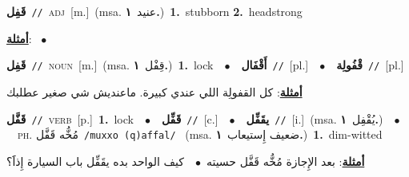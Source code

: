 \documentclass[10pt,a4paper,twoside]{article} %
\begin{document}
\begin{multicols}{2}
{\setlength\topsep{0pt}\textbf{\foreignlanguage{arabic}{قَفِل}}\ {\color{gray}\texttt{//}\color{black}}\ \textsc{adj}\ [m.]\ \color{gray}(msa. \foreignlanguage{arabic}{عنيد}~\foreignlanguage{arabic}{\textbf{١.}})\color{black}\ \textbf{1.}~stubborn  \textbf{2.}~headstrong\  \begin{flushright}\color{gray}\foreignlanguage{arabic}{\textbf{\underline{\foreignlanguage{arabic}{أمثلة}}}: \ $\bullet$\ \  }\end{flushright}\color{black}} \vspace{2mm}

{\setlength\topsep{0pt}\textbf{\foreignlanguage{arabic}{قَفِل}}\ {\color{gray}\texttt{//}\color{black}}\ \textsc{noun}\ [m.]\ \color{gray}(msa. \foreignlanguage{arabic}{قِفْل}~\foreignlanguage{arabic}{\textbf{١.}})\color{black}\ \textbf{1.}~lock\ \ $\bullet$\ \ \setlength\topsep{0pt}\textbf{\foreignlanguage{arabic}{أَقْفَال}}\ {\color{gray}\texttt{//}\color{black}}\ [pl.]\ \ $\bullet$\ \ \setlength\topsep{0pt}\textbf{\foreignlanguage{arabic}{قْفُولِة}}\ {\color{gray}\texttt{//}\color{black}}\ [pl.]\  \begin{flushright}\color{gray}\foreignlanguage{arabic}{\textbf{\underline{\foreignlanguage{arabic}{أمثلة}}}: كل القفولِة اللي عندي كبيرة. ماعنديش شي صغير عطلبك}\end{flushright}\color{black}} \vspace{2mm}

{\setlength\topsep{0pt}\textbf{\foreignlanguage{arabic}{قَفَّل}}\ {\color{gray}\texttt{//}\color{black}}\ \textsc{verb}\ [p.]\ \textbf{1.}~lock\ \ $\bullet$\ \ \setlength\topsep{0pt}\textbf{\foreignlanguage{arabic}{قَفِّل}}\ {\color{gray}\texttt{//}\color{black}}\ [c.]\ \ $\bullet$\ \ \setlength\topsep{0pt}\textbf{\foreignlanguage{arabic}{يقَفِّل}}\ {\color{gray}\texttt{//}\color{black}}\ [i.]\ \color{gray}(msa. \foreignlanguage{arabic}{يُقْفِل}~\foreignlanguage{arabic}{\textbf{١.}})\color{black}\ \ $\bullet$\ \ \textsc{ph.} \color{gray} \foreignlanguage{arabic}{مُخُّه قَفَّل}\color{black}\ {\color{gray}\texttt{/{\sffamily muxxo (q)affal}/}\color{black}}\ \color{gray} (msa. \foreignlanguage{arabic}{ضعيف إِستيعاب}~\foreignlanguage{arabic}{\textbf{١.}})\color{black}\ \textbf{1.}~dim-witted\  \begin{flushright}\color{gray}\foreignlanguage{arabic}{\textbf{\underline{\foreignlanguage{arabic}{أمثلة}}}: بعد الإِجازة مُخُّه قَفَّل حسيته\ $\bullet$\ \  كيف الواحد بده يقَفِّل باب السيارة إِذاََ؟}\end{flushright}\color{black}} \vspace{2mm}


\end{multicols}
\end{document}
